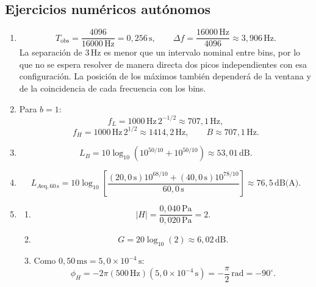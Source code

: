 \subsection*{Ejercicios numéricos autónomos}

\begin{enumerate}[label=\textbf{A\arabic*.},leftmargin=*]
    \item
    \[
        T_\mathrm{obs}=\frac{4096}{16000\,\text{Hz}}
                      =0{,}256\,\text{s},
        \qquad
        \Delta f=\frac{16000\,\text{Hz}}{4096}
                \approx3{,}906\,\text{Hz}.
    \]
    La separación de \(3\,\text{Hz}\) es menor que un intervalo nominal entre
    bins, por lo que no se espera resolver de manera directa dos picos
    independientes con esa configuración. La posición de los máximos también
    dependerá de la ventana y de la coincidencia de cada frecuencia con los
    bins.

    \item Para \(b=1\):
    \[
        f_L=1000\,\text{Hz}\,2^{-1/2}
           \approx707{,}1\,\text{Hz},
    \]
    \[
        f_H=1000\,\text{Hz}\,2^{1/2}
           \approx1414{,}2\,\text{Hz},
        \qquad
        B\approx707{,}1\,\text{Hz}.
    \]

    \item
    \[
        L_B=10\log_{10}
        \left(10^{50/10}+10^{50/10}\right)
        \approx53{,}01\,\text{dB}.
    \]

    \item
    \[
        L_{A\mathrm{eq},60\,\mathrm{s}}
        =10\log_{10}\!
        \left[
            \frac{
                (20{,}0\,\text{s})10^{68/10}
                +(40{,}0\,\text{s})10^{78/10}
            }{60{,}0\,\text{s}}
        \right]
        \approx76{,}5\,\text{dB(A)}.
    \]

    \item
    \begin{enumerate}[label=\alph*)]
        \item
        \[
            \lvert H\rvert=\frac{0{,}040\,\text{Pa}}
                                 {0{,}020\,\text{Pa}}
                           =2.
        \]
        \item
        \[
            G=20\log_{10}(2)\approx6{,}02\,\text{dB}.
        \]
        \item Como
        \(0{,}50\,\text{ms}=5{,}0\times10^{-4}\,\text{s}\):
        \[
            \phi_H=-2\pi(500\,\text{Hz})
            (5{,}0\times10^{-4}\,\text{s})
            =-\frac{\pi}{2}\,\text{rad}
            =-90^\circ.
        \]
    \end{enumerate}
\end{enumerate}

